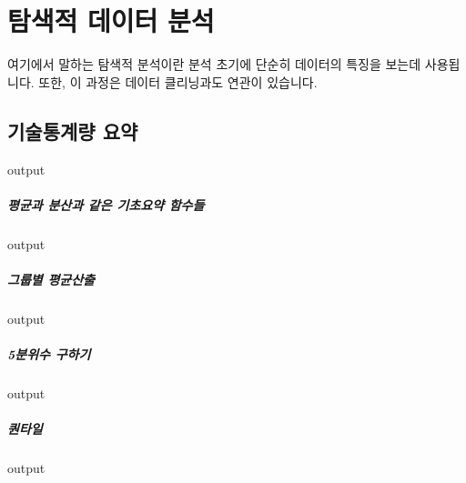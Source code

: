 \documentclass{report}
\begin{document}
%
%
%

\chapter{탐색적 데이터 분석}

여기에서 말하는 탐색적 분석이란 분석 초기에 단순히 데이터의 특징을 보는데 사용됩니다. 
또한, 이 과정은 데이터 클리닝과도 연관이 있습니다. 

\section{기술통계량 요약}
\begin{Schunk}
\begin{Soutput}
output
\end{Soutput}
\end{Schunk}

\paragraph{평균과 분산과 같은 기초요약 함수들}
\begin{Schunk}
\begin{Soutput}
output
\end{Soutput}
\end{Schunk}

\paragraph{그룹별 평균산출}
\begin{Schunk}
\begin{Soutput}
output
\end{Soutput}
\end{Schunk}

\paragraph{5분위수 구하기}
\begin{Schunk}
\begin{Soutput}
output
\end{Soutput}
\end{Schunk}

\paragraph{퀀타일}
\begin{Schunk}
\begin{Soutput}
output
\end{Soutput}
\end{Schunk}
\end{document}
